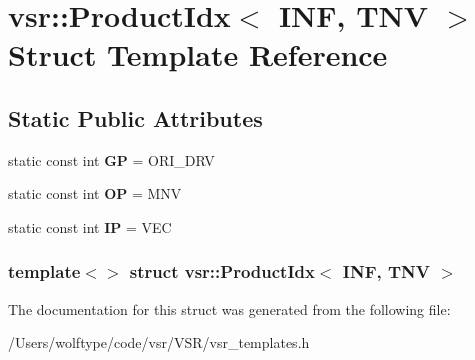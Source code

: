 \hypertarget{structvsr_1_1_product_idx_3_01_i_n_f_00_01_t_n_v_01_4}{\section{vsr\-:\-:Product\-Idx$<$ I\-N\-F, T\-N\-V $>$ Struct Template Reference}
\label{structvsr_1_1_product_idx_3_01_i_n_f_00_01_t_n_v_01_4}
}
\subsection*{Static Public Attributes}
\begin{DoxyCompactItemize}
\item 
\hypertarget{structvsr_1_1_product_idx_3_01_i_n_f_00_01_t_n_v_01_4_afcb39ff4352866cb511de9fdadab5d07}{static const int {\bfseries G\-P} = O\-R\-I\-\_\-\-D\-R\-V}\label{structvsr_1_1_product_idx_3_01_i_n_f_00_01_t_n_v_01_4_afcb39ff4352866cb511de9fdadab5d07}

\item 
\hypertarget{structvsr_1_1_product_idx_3_01_i_n_f_00_01_t_n_v_01_4_a4a47f615f7878fe95f8dc81abbf206fb}{static const int {\bfseries O\-P} = M\-N\-V}\label{structvsr_1_1_product_idx_3_01_i_n_f_00_01_t_n_v_01_4_a4a47f615f7878fe95f8dc81abbf206fb}

\item 
\hypertarget{structvsr_1_1_product_idx_3_01_i_n_f_00_01_t_n_v_01_4_a8769494199401342b0f2d9da8c47133b}{static const int {\bfseries I\-P} = V\-E\-C}\label{structvsr_1_1_product_idx_3_01_i_n_f_00_01_t_n_v_01_4_a8769494199401342b0f2d9da8c47133b}

\end{DoxyCompactItemize}
\subsubsection*{template$<$$>$ struct vsr\-::\-Product\-Idx$<$ I\-N\-F, T\-N\-V $>$}



The documentation for this struct was generated from the following file\-:\begin{DoxyCompactItemize}
\item 
/\-Users/wolftype/code/vsr/\-V\-S\-R/vsr\-\_\-templates.\-h\end{DoxyCompactItemize}
